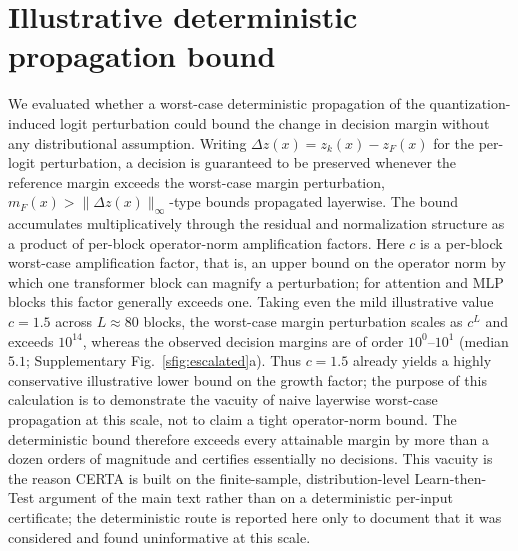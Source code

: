 \documentclass[11pt]{article}
\theoremstyle{plain}
\begin{document}
\section{Illustrative deterministic propagation bound}
We evaluated whether a worst-case deterministic propagation of the quantization-induced logit
perturbation could bound the change in decision margin without any distributional assumption. Writing
$\Delta z(x)=z_k(x)-z_F(x)$ for the per-logit perturbation, a decision is guaranteed to be preserved
whenever the reference margin exceeds the worst-case margin perturbation,
$m_F(x) > \lVert \Delta z(x)\rVert_\infty$-type bounds propagated layerwise. The bound accumulates
multiplicatively through the residual and normalization structure as a product of per-block
operator-norm amplification factors. Here $c$ is a per-block worst-case amplification factor, that is,
an upper bound on the operator norm by which one transformer block can magnify a perturbation; for
attention and MLP blocks this factor generally exceeds one. Taking even the mild illustrative value
$c=1.5$ across $L\approx80$ blocks, the worst-case margin perturbation scales as $c^{L}$ and
exceeds $10^{14}$, whereas the observed decision margins are of order $10^{0}$--$10^{1}$ (median $5.1$;
Supplementary Fig.~\ref{sfig:escalated}a). Thus $c=1.5$ already yields a highly conservative illustrative
lower bound on the growth factor; the purpose of this calculation is to demonstrate the vacuity of naive
layerwise worst-case propagation at this scale, not to claim a tight operator-norm bound. The deterministic bound therefore exceeds every attainable margin by
more than a dozen orders of magnitude and certifies essentially no decisions. This vacuity is the
reason CERTA is built on the finite-sample, distribution-level Learn-then-Test argument of the main
text rather than on a deterministic per-input certificate; the deterministic route is reported here
only to document that it was considered and found uninformative at this scale.

\end{document}
